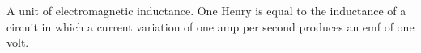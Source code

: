 A unit of electromagnetic inductance. One Henry is equal to the inductance
of a circuit in which a current variation of one amp per second produces
an emf of one volt.
